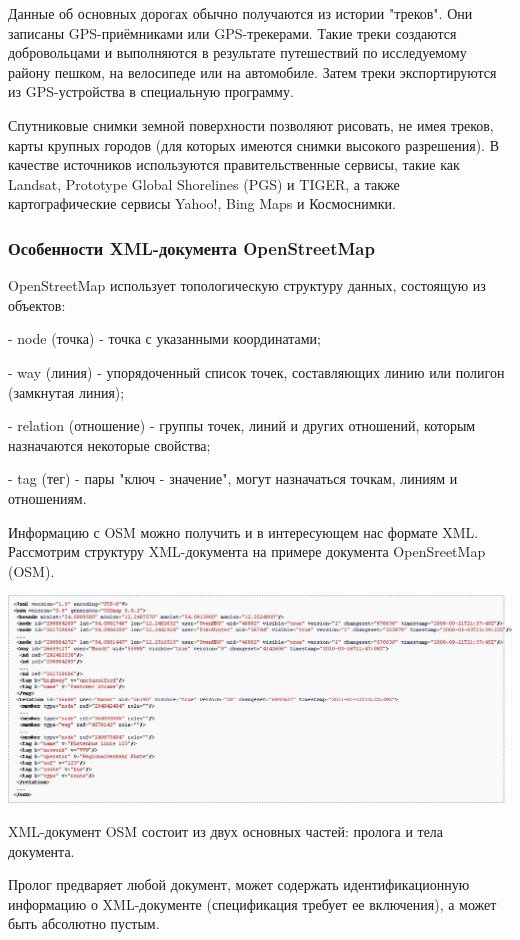 \documentclass[12pt,a4paper,oneside]{article} %
\begin{document}
Данные об основных дорогах обычно получаются из истории "треков". Они записаны GPS-приёмниками или GPS-трекерами. Такие треки создаются добровольцами и выполняются в результате путешествий по исследуемому району пешком, на велосипеде или на автомобиле. Затем треки экспортируются из GPS-устройства в специальную программу.

Спутниковые снимки земной поверхности позволяют рисовать, не имея треков, карты крупных городов (для которых имеются снимки высокого разрешения). В качестве источников используются правительственные сервисы, такие как Landsat, Prototype Global Shorelines (PGS) и TIGER, а также картографические сервисы Yahoo!, Bing Maps и Космоснимки.

\newpage
\subsubsection{Особенности XML-документа OpenStreetMap}

OpenStreetMap использует топологическую структуру данных, состоящую из объектов:

- node (точка) - точка с указанными координатами;

- way (линия) - упорядоченный список точек, составляющих линию или полигон (замкнутая линия);

- relation (отношение) - группы точек, линий и других отношений, которым назначаются некоторые свойства;

- tag (тег) - пары "ключ - значение", могут назначаться точкам, линиям и отношениям.

Информацию с OSM можно получить и в интересующем нас формате XML. Рассмотрим структуру XML-документа на примере документа OpenSreetMap (OSM).

\includegraphics[width=1\linewidth]{type}

XML-документ OSM состоит из двух основных частей: пролога и тела документа.

Пролог предваряет любой документ, может содержать идентификационную информацию о XML-документе (спецификация требует ее включения), а может быть абсолютно пустым.
\end{document}

